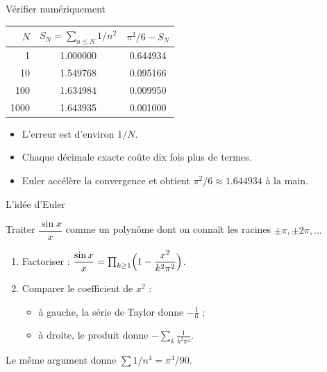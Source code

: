 \documentclass[nuit,charter,pied]{BeamerJS}
\begin{document}
\begin{frame}{Vérifier numériquement}
	\begin{center}
		\begin{tabular}{r S[table-format=1.6] S[table-format=1.6]}
			\toprule
			{$N$} & {$S_N=\sum_{n\leq N}1/n^2$} & {$\pi^2/6-S_N$} \\
			\midrule
			\num{1}    & 1.000000 & 0.644934 \\
			\num{10}   & 1.549768 & 0.095166 \\
			\num{100}  & 1.634984 & 0.009950 \\
			\num{1000} & 1.643935 & 0.001000 \\
			\bottomrule
		\end{tabular}
	\end{center}

	\begin{itemize}[<+->]
		\item L'erreur est d'environ \alert<2>{$1/N$}.
		\item Chaque décimale exacte coûte \alert<3>{dix fois plus} de termes.
		\item Euler accélère la convergence et obtient
			  $\pi^2/6\approx\num{1.644934}$ à la main.
	\end{itemize}
\end{frame}

\begin{frame}{L'idée d'Euler}
	\begin{lumiere}
		Traiter $\dfrac{\sin x}{x}$ comme un polynôme dont on connaît les
		racines $\pm\pi,\pm2\pi,\dots$
	\end{lumiere}

	\begin{enumerate}
		\item Factoriser :
			$\dfrac{\sin x}{x}=\prod_{k\geq1}\Bigl(1-\dfrac{x^2}{k^2\pi^2}\Bigr)$.
		\item Comparer le coefficient de $x^2$ :
			\begin{itemize}
				\item à gauche, la série de Taylor donne $-\frac16$ ;
				\item à droite, le produit donne $-\sum_k\frac{1}{k^2\pi^2}$.
			\end{itemize}
	\end{enumerate}

	\begin{ex}
		Le même argument donne $\sum 1/n^4=\pi^4/90$.
	\end{ex}
\end{frame}
\end{document}
